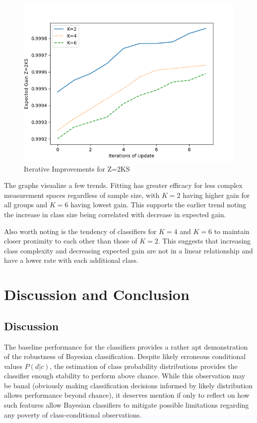 \documentclass[10pt, conference]{IEEEtran}
\begin{document}
\begin{figure}[htbp]
\centerline{\includegraphics[scale=0.5]{Z_2KS.png}}
\caption{Iterative Improvements for Z=2KS}
\label{fig}
\end{figure}
The graphs visualize a few trends. Fitting has greater efficacy for less complex measurement spaces regardless of sample size, with $K=2$ having higher gain for all groups and $K=6$ having lowest gain. This supports the earlier trend noting the increase in class size being correlated with decrease in expected gain.

Also worth noting is the tendency of classifiers for $K=4$ and $K=6$ to maintain closer proximity to each other than those of $K=2$. This suggests that increasing class complexity and decreasing expected gain are not in a linear relationship and have a lower rate with each additional class. 
\section{Discussion and Conclusion}
\subsection{Discussion}
The baseline performance  for the classifiers provides a rather apt demonstration of the robustness of Bayesian classification. Despite likely erroneous conditional values $P(d|c)$, the estimation of class probability distributions provides the classifier enough stability to perform above chance. While this observation may be banal (obviously making classification decisions informed by likely distribution allows performance beyond chance), it deserves mention if only to reflect on how such features allow Bayesian classifiers to mitigate possible limitations regarding any poverty of class-conditional observations.
\end{document}
